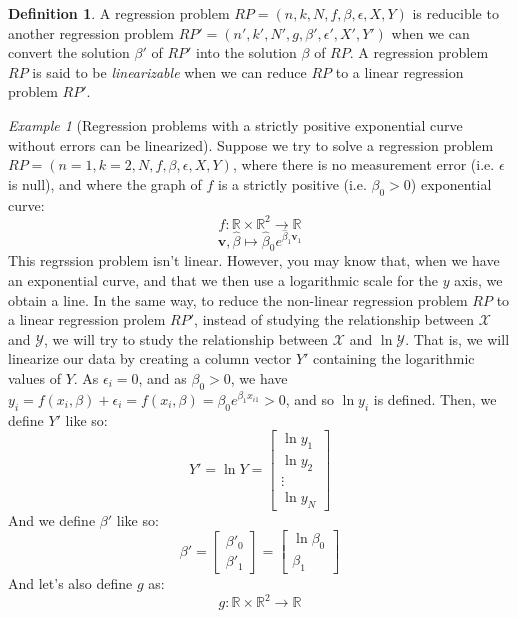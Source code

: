 \documentclass{article}
\theoremstyle{definition}
\newtheorem{definition}{Definition}[section]
\theoremstyle{remark}
\theoremstyle{example}
\newtheorem{example}{Example}[section]
\newcommand{\vv}{\mathbf{v}}
\newcommand{\fvector}[2]{\begin{bmatrix} #1_1 \\ #1_2 \\ \vdots \\ #1_{#2} \end{bmatrix}}
\begin{document}
\begin{definition}
		A regression problem $RP = (n, k, N, f, \beta, \epsilon, X, Y)$ is reducible to another regression problem $RP' = (n', k', N', g, \beta', \epsilon', X', Y')$ when we can convert the solution $\beta'$ of $RP'$ into the solution $\beta$ of $RP$. A regression problem $RP$ is said to be \textit{linearizable} when we can reduce $RP$ to a linear regression problem $RP'$. %
\end{definition}

\begin{example}[Regression problems with a strictly positive exponential curve without errors can be linearized]
		Suppose we try to solve a regression problem $RP = (n=1, k=2, N, f, \beta, \epsilon, X, Y)$, where there is no measurement error (i.e. $\epsilon$ is null), and where the graph of $f$ is a strictly positive (i.e. $\beta_0 > 0$) exponential curve:
				$$f : \mathbb{R} \times \mathbb{R}^2 \rightarrow \mathbb{R}$$
				$$\vv, \hat{\beta} \mapsto \hat{\beta}_0 e^{\hat{\beta}_1 \vv_1}$$
		This regrssion problem isn't linear. However, you may know that, when we have an exponential curve, and that we then use a logarithmic scale for the $y$ axis, we obtain a line. In the same way, to reduce the non-linear regression problem $RP$ to a linear regression prolem $RP'$, instead of studying the relationship between $\mathcal{X}$ and $\mathcal{Y}$, we will try to study the relationship between $\mathcal{X}$ and $\ln \mathcal{Y}$. That is, we will linearize our data by creating a column vector $Y'$ containing the logarithmic values of $Y$. As $\epsilon_i = 0$, and as $\beta_0 > 0$, we have $y_i = f(x_i, \beta) + \epsilon_i = f(x_i, \beta) = \beta_0 e^{\beta_1 x_{i1}} > 0$, and so $\ln y_i$ is defined. Then, we define $Y'$ like so:
				$$Y' = \ln Y = \fvector{\ln y}{N}$$
		And we define $\beta'$ like so:
				$$\beta' = \begin{bmatrix} \beta'_0 \\ \beta'_1 \end{bmatrix} = \begin{bmatrix} \ln \beta_0 \\ \beta_1 \end{bmatrix}$$
		And let's also define $g$ as:
				$$g : \mathbb{R} \times \mathbb{R}^2 \rightarrow \mathbb{R}$$

\end{example}
\end{document}
